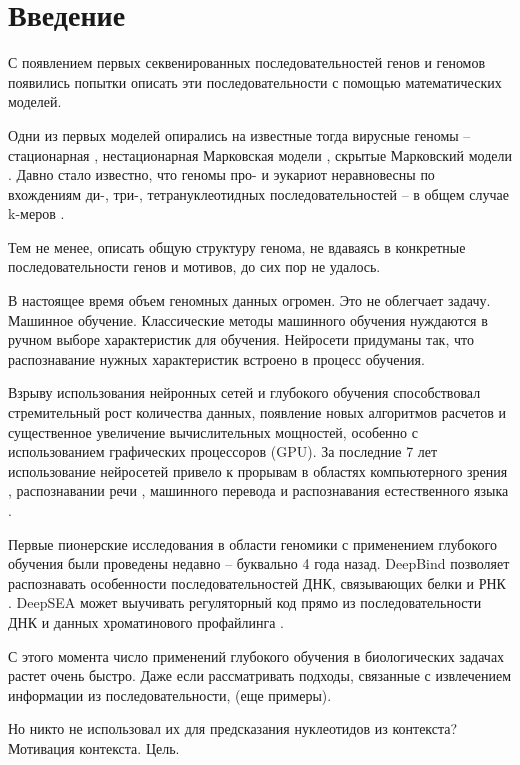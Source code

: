 \section{Введение}

С появлением первых секвенированных последовательностей генов и геномов появились попытки описать эти последовательности с помощью математических моделей.

Одни из первых моделей опирались на известные тогда вирусные геномы -- стационарная \cite{garden_markov_1980}, нестационарная Марковская модели \cite{tavare_codon_1989}, скрытые Марковский модели \cite{churchill_stochastic_1989}. 
Давно стало известно, что геномы про- и эукариот неравновесны по вхождениям ди-, три-, тетрануклеотидных последовательностей -- в общем случае k-меров \cite{phillips_mono-_1987}. 

Тем не менее, описать общую структуру генома, не вдаваясь в конкретные последовательности генов и мотивов, до сих пор не удалось.

В настоящее время объем геномных данных огромен. Это не облегчает задачу. Машинное обучение. Классические методы машинного обучения нуждаются в ручном выборе характеристик для обучения. Нейросети придуманы так, что распознавание нужных характеристик встроено в процесс обучения.

Взрыву использования нейронных сетей и глубокого обучения способствовал стремительный рост количества данных, появление новых алгоритмов расчетов и существенное увеличение вычислительных мощностей, особенно с использованием графических процессоров (GPU).
За последние 7 лет использование нейросетей привело к прорывам в областях компьютерного зрения \cite{krizhevsky_imagenet_2012, girshick_region-based_2016, long_fully_2015}, распознавании речи \cite{hannun_deep_2014}, машинного перевода и распознавания естественного языка \cite{wu_googles_2016}.

Первые пионерские исследования в области геномики с применением глубокого обучения были проведены недавно -- буквально 4 года назад. DeepBind позволяет распознавать особенности последовательностей ДНК, связывающих белки и РНК \cite{alipanahi_predicting_2015}. DeepSEA может выучивать регуляторный код  прямо из последовательности ДНК и данных хроматинового профайлинга \cite{zhou_predicting_2015}. 

С этого момента число применений глубокого обучения в биологических задачах растет очень быстро. Даже если рассматривать подходы, связанные с извлечением информации из последовательности, (еще примеры).

Но никто не использовал их для предсказания нуклеотидов из контекста? Мотивация контекста. Цель.
